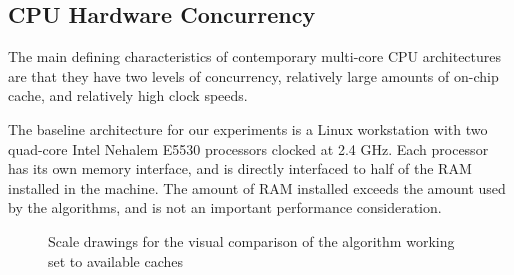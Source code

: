 \documentclass[10pt,twocolumn,letterpaper]{article}
\begin{document}
\subsection{CPU Hardware Concurrency} 
\label{sec:CPU-concurrency}
The main defining characteristics of contemporary multi-core CPU architectures
are that they have two levels of concurrency, relatively large amounts of
on-chip cache, and relatively high clock speeds.

The baseline architecture for our experiments is a Linux workstation with two
quad-core Intel Nehalem E5530 processors clocked at 2.4 GHz.  Each processor
has its own memory interface, and is directly interfaced to half of the RAM
installed in the machine.  The amount of RAM installed exceeds the amount used
by the algorithms, and is not an important performance consideration.  

\begin{figure}
\centering
{}
\label{fig:caches}
\caption{Scale drawings for the visual comparison of the algorithm
working set to available caches}
\end{figure}
\end{document}
